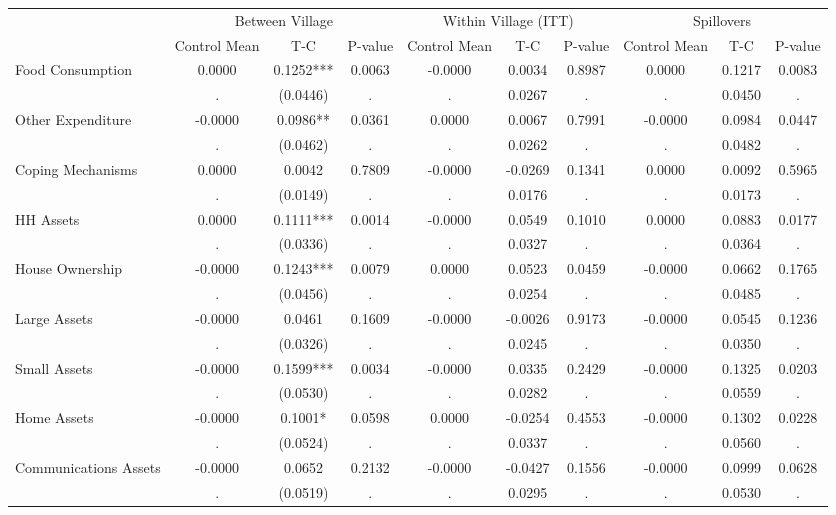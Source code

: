 \begin{tabular}{l*{9}{c}}\hline&\multicolumn{3}{c}{Between Village}&\multicolumn{3}{c}{Within Village (ITT)}&\multicolumn{3}{c}{Spillovers} \\ \cmidrule(r){2-4}\cmidrule(l){5-7}\cmidrule(l){8-10} & {Control Mean} & {T-C} & {P-value} & {Control Mean} & {T-C} & {P-value} & {Control Mean} & {T-C} & {P-value} \\ \midrule  
Food Consumption & 0.0000 & 0.1252*** & 0.0063 & -0.0000 & 0.0034 & 0.8987 & 0.0000 & 0.1217 & 0.0083 \\
  & . & (0.0446) & . & . & 0.0267 & . & . & 0.0450 & . \\
Other Expenditure & -0.0000 & 0.0986** & 0.0361 & 0.0000 & 0.0067 & 0.7991 & -0.0000 & 0.0984 & 0.0447 \\
  & . & (0.0462) & . & . & 0.0262 & . & . & 0.0482 & . \\
Coping Mechanisms & 0.0000 & 0.0042 & 0.7809 & -0.0000 & -0.0269 & 0.1341 & 0.0000 & 0.0092 & 0.5965 \\
  & . & (0.0149) & . & . & 0.0176 & . & . & 0.0173 & . \\
HH Assets & 0.0000 & 0.1111*** & 0.0014 & -0.0000 & 0.0549 & 0.1010 & 0.0000 & 0.0883 & 0.0177 \\
  & . & (0.0336) & . & . & 0.0327 & . & . & 0.0364 & . \\
House Ownership & -0.0000 & 0.1243*** & 0.0079 & 0.0000 & 0.0523 & 0.0459 & -0.0000 & 0.0662 & 0.1765 \\
  & . & (0.0456) & . & . & 0.0254 & . & . & 0.0485 & . \\
Large Assets & -0.0000 & 0.0461 & 0.1609 & -0.0000 & -0.0026 & 0.9173 & -0.0000 & 0.0545 & 0.1236 \\
  & . & (0.0326) & . & . & 0.0245 & . & . & 0.0350 & . \\
Small Assets & -0.0000 & 0.1599*** & 0.0034 & -0.0000 & 0.0335 & 0.2429 & -0.0000 & 0.1325 & 0.0203 \\
  & . & (0.0530) & . & . & 0.0282 & . & . & 0.0559 & . \\
Home Assets & -0.0000 & 0.1001* & 0.0598 & 0.0000 & -0.0254 & 0.4553 & -0.0000 & 0.1302 & 0.0228 \\
  & . & (0.0524) & . & . & 0.0337 & . & . & 0.0560 & . \\
Communications Assets & -0.0000 & 0.0652 & 0.2132 & -0.0000 & -0.0427 & 0.1556 & -0.0000 & 0.0999 & 0.0628 \\
  & . & (0.0519) & . & . & 0.0295 & . & . & 0.0530 & . \\

\end{tabular}
